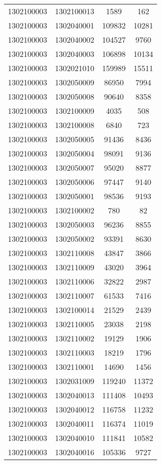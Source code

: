 \begin{longtable}{llcc}
1302100003 & 1302100013 & 1589 & 162\\
1302100003 & 1302040001 & 109832 & 10281\\
1302100003 & 1302040002 & 104527 & 9760\\
1302100003 & 1302040003 & 106898 & 10134\\
1302100003 & 1302021010 & 159989 & 15511\\
1302100003 & 1302050009 & 86950 & 7994\\
1302100003 & 1302050008 & 90640 & 8358\\
1302100003 & 1302100009 & 4035 & 508\\
1302100003 & 1302100008 & 6840 & 723\\
1302100003 & 1302050005 & 91436 & 8436\\
1302100003 & 1302050004 & 98091 & 9136\\
1302100003 & 1302050007 & 95020 & 8877\\
1302100003 & 1302050006 & 97447 & 9140\\
1302100003 & 1302050001 & 98536 & 9193\\
1302100003 & 1302100002 & 780 & 82\\
1302100003 & 1302050003 & 96236 & 8855\\
1302100003 & 1302050002 & 93391 & 8630\\
1302100003 & 1302110008 & 43847 & 3866\\
1302100003 & 1302110009 & 43020 & 3964\\
1302100003 & 1302110006 & 32822 & 2987\\
1302100003 & 1302110007 & 61533 & 7416\\
1302100003 & 1302100014 & 21529 & 2439\\
1302100003 & 1302110005 & 23038 & 2198\\
1302100003 & 1302110002 & 19129 & 1906\\
1302100003 & 1302110003 & 18219 & 1796\\
1302100003 & 1302110001 & 14690 & 1456\\
1302100003 & 1302031009 & 119240 & 11372\\
1302100003 & 1302040013 & 111408 & 10493\\
1302100003 & 1302040012 & 116758 & 11232\\
1302100003 & 1302040011 & 116374 & 11019\\
1302100003 & 1302040010 & 111841 & 10582\\
1302100003 & 1302040016 & 105336 & 9727\\

\end{longtable}
